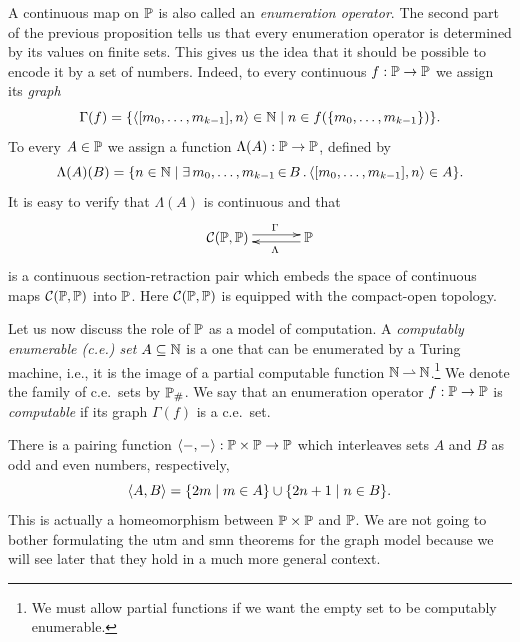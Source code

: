 A continuous map on $\mathbb{P}$ is also called an \emph{enumeration
  operator}. The second part of the previous proposition tells us that
every enumeration operator is determined by its values on finite sets.
This gives us the idea that it should be possible to encode it by a
set of numbers. Indeed, to every continuous $f : \mathbb{P} \to \mathbb{P}$ we
assign its \emph{graph}
%
\begin{equation*}
  \Gamma(f) = \{\langle [m_0, \ldots, m_{k-1}], n \rangle \in \mathbb{N} \mid
    n \in f(\{m_0, \ldots, m_{k-1}\})
  \}.
\end{equation*}
%
To every $A \in \mathbb{P}$ we assign a function $\Lambda(A) : \mathbb{P} \to
\mathbb{P}$, defined by
%
\begin{equation*}
  \Lambda(A)(B) = \{n \in \mathbb{N} \mid
    \exists\, m_0, \ldots, m_{k-1} \,{\in}\, B\,.\,\langle [m_0, \ldots, m_{k-1}], n \rangle \in A
  \}.
\end{equation*}
%
It is easy to verify that $\Lambda(A)$ is continuous and that
%
\begin{equation*}
  \xymatrix{
    **[l]{\mathcal{C}(\Scott, \Scott)}
    \ar@<+0.25em>[r]^{\Gamma}
    &
    {\Scott}
    \ar@<+0.25em>[l]^{\Lambda}
  }
\end{equation*}
%
is a continuous section-retraction pair which embeds the space of
continuous maps $\mathcal{C}(\mathbb{P}, \mathbb{P})$ into $\mathbb{P}$. Here
$\mathcal{C}(\mathbb{P}, \mathbb{P})$ is equipped with the compact-open
topology.

Let us now discuss the role of $\mathbb{P}$ as a model of computation. A
\emph{computably enumerable (c.e.) set} $A \subseteq \mathbb{N}$ is a one
that can be enumerated by a Turing machine, i.e., it is the image of a
partial computable function $\mathbb{N} \mathbin{\rightharpoonup} \mathbb{N}$.\footnote{We must allow
  partial functions if we want the empty set to be computably
  enumerable.} We denote the family of c.e.~sets by $\mathbb{P}_{\#}$. We say
that an enumeration operator $f : \mathbb{P} \to \mathbb{P}$ is
\emph{computable} if its graph $\Gamma(f)$ is a c.e.~set.

There is a pairing function $\langle {-}, {-} \rangle : \mathbb{P} \times \mathbb{P}
\to \mathbb{P}$ which interleaves sets $A$ and $B$ as odd and even
numbers, respectively,
%
\begin{equation*}
  \langle A, B \rangle = \{2 m \mid m \in A\} \cup \{2 n + 1 \mid n \in B\}.
\end{equation*}
%
This is actually a homeomorphism between $\mathbb{P} \times \mathbb{P}$ and
$\mathbb{P}$. We are not going to bother formulating the utm and smn
theorems for the graph model because we will see later that they hold
in a much more general context.

